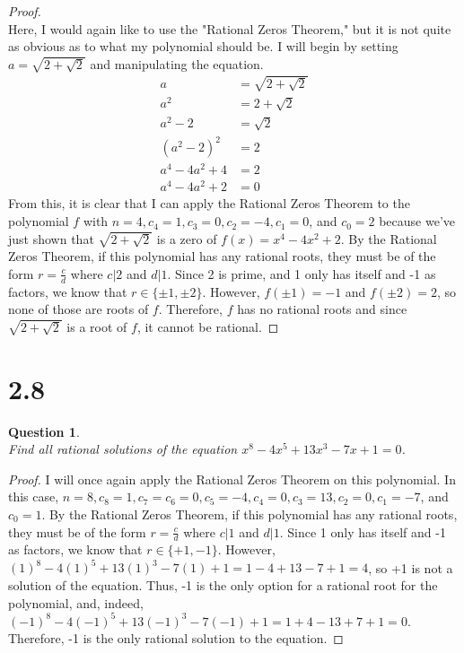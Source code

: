\documentclass[10pt,a4paper]{article}
\newtheorem*{question*}{Question}
\begin{document}
\begin{proof}{$ $}
\\Here, I would again like to use the "Rational Zeros Theorem," but it is not quite as obvious as to what my polynomial should be. I will begin by setting $a = \sqrt{2 + \sqrt{2}}$ and manipulating the equation.
\begin{align*}
a &= \sqrt{2 + \sqrt{2}}\\
a^2 &= 2 + \sqrt{2}\\
a^2 - 2 &= \sqrt{2}\\
(a^2 - 2)^2 &= 2\\
a^4 - 4a^2 + 4 &= 2\\
a^4 - 4a^2 + 2 &= 0
\end{align*}
From this, it is clear that I can apply the Rational Zeros Theorem to the polynomial $f$ with $n = 4, c_4 = 1, c_3 = 0, c_2 = -4, c_1 = 0$, and $c_0 = 2$ because we've just shown that $\sqrt{2 + \sqrt{2}}$ is a zero of $f(x) = x^4 - 4x^2 + 2$. By the Rational Zeros Theorem, if this polynomial has any rational roots, they must be of the form $r = \frac{c}{d}$ where $c|2$ and $d|1$. Since 2 is prime, and 1 only has itself and -1 as factors, we know that $r \in \{\pm 1,\pm 2\}$. However, $f(\pm 1) = -1$ and $f(\pm 2) = 2$, so none of those are roots of $f$. Therefore, $f$ has no rational roots and since $\sqrt{2 + \sqrt{2}}$ is a root of $f$, it cannot be rational. 
\end{proof}

\section*{2.8}
\begin{question*}{$ $}
\\Find all rational solutions of the equation $x^8 - 4x^5 + 13x^3 - 7x + 1 = 0$.
\end{question*}

\begin{proof}
I will once again apply the Rational Zeros Theorem on this polynomial. In this case, $n = 8, c_8 = 1, c_7 = c_6 = 0, c_5 = -4, c_4 = 0, c_3 = 13, c_2 = 0, c_1 = -7$, and $c_0 = 1$. By the Rational Zeros Theorem, if this polynomial has any rational roots, they must be of the form $r = \frac{c}{d}$ where $c|1$ and $d|1$. Since 1 only has itself and -1 as factors, we know that $r \in \{+1, -1\}$. However, $(1)^8 - 4(1)^5 + 13(1)^3 - 7(1) + 1 = 1 - 4 + 13 - 7 + 1 = 4$, so +1 is not a solution of the equation. Thus, -1 is the only option for a rational root for the polynomial, and, indeed, $(-1)^8 - 4(-1)^5 + 13(-1)^3 - 7(-1) + 1 = 1 + 4 - 13 + 7 + 1 = 0$. Therefore, -1 is the only rational solution to the equation.
\end{proof}
\end{document}
